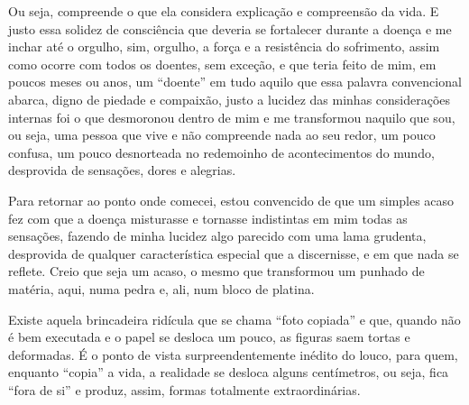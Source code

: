 Ou seja, compreende o que ela considera explicação e compreensão da
vida. E justo essa solidez de consciência que deveria se fortalecer
durante a doença e me inchar até o orgulho, sim, orgulho, a força e a
resistência do sofrimento, assim como ocorre com todos os doentes, sem
exceção, e que teria feito de mim, em poucos meses ou anos, um
``doente'' em tudo aquilo que essa palavra convencional abarca, digno de
piedade e compaixão, justo a lucidez das minhas considerações internas
foi o que desmoronou dentro de mim e me transformou naquilo que sou, ou
seja, uma pessoa que vive e não compreende nada ao seu redor, um pouco
confusa, um pouco desnorteada no redemoinho de acontecimentos do mundo,
desprovida de sensações, dores e alegrias.


Para retornar ao ponto onde comecei, estou convencido de que um simples
acaso fez com que a doença misturasse e tornasse indistintas em mim
todas as sensações, fazendo de minha lucidez algo parecido com uma lama
grudenta, desprovida de qualquer característica especial que a
discernisse, e em que nada se reflete. Creio que seja um acaso, o mesmo
que transformou um punhado de matéria, aqui, numa pedra e, ali, num
bloco de platina.


Existe aquela brincadeira ridícula que se chama ``foto copiada'' e que,
quando não é bem executada e o papel se desloca um pouco, as figuras
saem tortas e deformadas. É o ponto de vista surpreendentemente inédito
do louco, para quem, enquanto ``copia'' a vida, a realidade se desloca
alguns centímetros, ou seja, fica ``fora de si'' e produz, assim, formas
totalmente extraordinárias.

